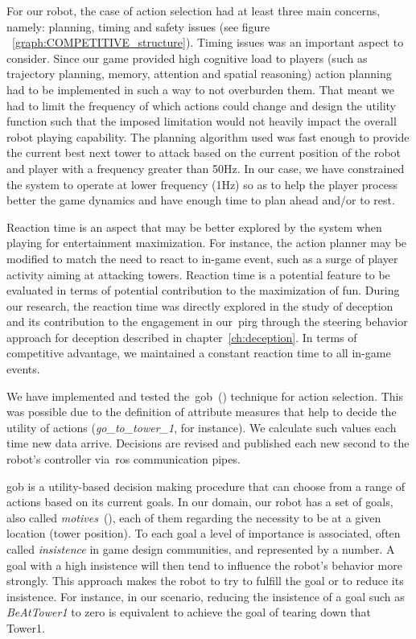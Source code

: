 For our robot, the case of action selection had at least three main concerns, namely: planning, timing and safety issues (see figure ~\ref{graph:COMPETITIVE_structure}). Timing issues was an important aspect to consider. Since our game provided high cognitive load to players (such as trajectory planning, memory, attention and spatial reasoning) action planning had to be implemented in such a way to not overburden them. That meant we had to limit the frequency of which actions could change and design the utility function such that the imposed limitation would not heavily impact the overall robot playing capability. The planning algorithm used was fast enough to provide the current best next tower to attack based on the current position of the robot and player with a frequency greater than 50Hz. In our case, we have constrained the system to operate at lower frequency (1Hz) so as to help the player process better the game dynamics and have enough time to plan ahead and/or to rest. 



Reaction time is an aspect that may be better explored by the system when playing for entertainment maximization. For instance, the action planner may be modified to match the need to react to in-game event, such as a surge of player activity aiming at attacking towers. Reaction time is a potential feature to be evaluated in terms of potential contribution to the maximization of fun. During our research, the reaction time was directly explored in the study of deception and its contribution to the engagement in our~\gls{pirg} through the steering behavior approach for deception described in chapter~\ref{ch:deception}. In terms of competitive advantage, we maintained a constant reaction time to all in-game events.

We have implemented and tested the~\gls{gob}~(\cite{millington_artificial_2009}) technique for action selection. This was possible due to the definition of attribute measures that help to decide the utility of actions (\textit{go\_to\_tower\_1}, for instance). We calculate such values each time new data arrive. Decisions are revised and published each new second to the robot's controller via~\gls{ros} communication pipes.

\glsdesc{gob} is a utility-based decision making procedure that can choose from a range of actions based on its current goals. In our domain, our robot has a set of goals, also called \textit{motives}~(\cite{millington_artificial_2009}), each of them regarding the necessity to be at a given location (tower position). To each goal a level of importance is associated, often called \textit{insistence} in game design communities, and represented by a number. A goal with a high insistence will then tend to influence the robot's behavior more strongly. This approach makes the robot to try to fulfill the goal or to reduce its insistence. For instance, in our scenario, reducing the insistence of a goal such as \textit{BeAtTower1} to zero is equivalent to achieve the goal of tearing down that Tower1. 

